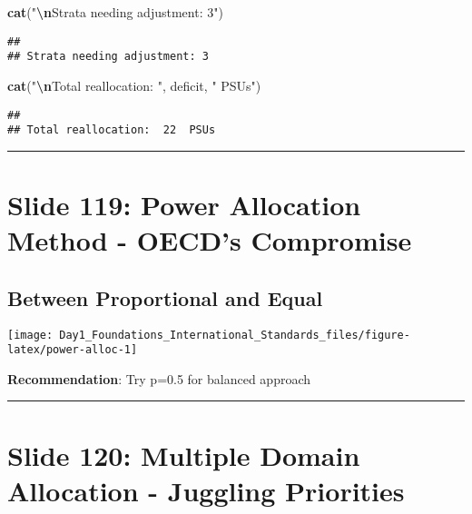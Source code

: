 \documentclass[
]{article}
\newenvironment{Shaded}{\begin{snugshade}}{\end{snugshade}}
\newcommand{\FunctionTok}[1]{\textcolor[rgb]{0.13,0.29,0.53}{\textbf{#1}}}
\newcommand{\NormalTok}[1]{#1}
\newcommand{\SpecialCharTok}[1]{\textcolor[rgb]{0.81,0.36,0.00}{\textbf{#1}}}
\newcommand{\StringTok}[1]{\textcolor[rgb]{0.31,0.60,0.02}{#1}}
\begin{document}
\begin{Shaded}
\begin{Highlighting}[]
\FunctionTok{cat}\NormalTok{(}\StringTok{"}\SpecialCharTok{\textbackslash{}n}\StringTok{Strata needing adjustment: 3"}\NormalTok{)}
\end{Highlighting}
\end{Shaded}

\begin{verbatim}
## 
## Strata needing adjustment: 3
\end{verbatim}

\begin{Shaded}
\begin{Highlighting}[]
\FunctionTok{cat}\NormalTok{(}\StringTok{"}\SpecialCharTok{\textbackslash{}n}\StringTok{Total reallocation: "}\NormalTok{, deficit, }\StringTok{" PSUs"}\NormalTok{)}
\end{Highlighting}
\end{Shaded}

\begin{verbatim}
## 
## Total reallocation:  22  PSUs
\end{verbatim}

\begin{center}\rule{0.5\linewidth}{0.5pt}\end{center}

\section{Slide 119: Power Allocation Method - OECD's
Compromise}\label{slide-119-power-allocation-method---oecds-compromise}

\subsection{Between Proportional and
Equal}\label{between-proportional-and-equal}

\texttt{[image: Day1\_Foundations\_International\_Standards\_files/figure-latex/power-alloc-1]}

\textbf{Recommendation}: Try p=0.5 for balanced approach

\begin{center}\rule{0.5\linewidth}{0.5pt}\end{center}

\section{Slide 120: Multiple Domain Allocation - Juggling
Priorities}\label{slide-120-multiple-domain-allocation---juggling-priorities}
\end{document}

